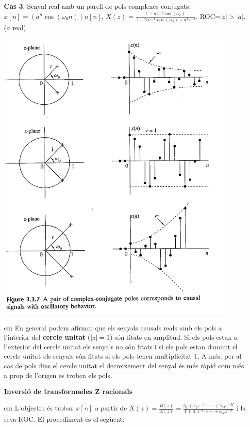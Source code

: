 \documentclass{article}
\begin{document}
\newpage
\noindent
\textbf{Cas 3}. Senyal real amb un parell de pols complexes conjugats: $x[n]=(a^n \cos(\omega_0 n) ) u[n]$, 
$X(z)=\frac{1-az^{-1}\cos(\omega_0)}{1-2az^{-1}\cos(\omega_0)+a^2z^{-2}}$, ROC=$|z|>|a|$, ($a$ real)
\begin{center}
\includegraphics[width=12cm]{doublecomplexpole.png}
\end{center}

 cm
\noindent
En general podem afirmar que els senyals causals reals amb els pols a l'interior del \textbf{cercle unitat} ($|z|=1$)
s\'on fitats en amplitud. Si els pols estan a l'exterior del cercle unitat els senyals no s\'on fitats i
si els pols estan damunt el cercle unitat els senyals s\'on fitats si els pols tenen multiplicitat 1.
A m\'es, per al cas de pols dins el cercle unitat el decreixement del senyal \'es m\'es r\`apid com m\'es
a prop de l'origen es troben els pols.

\newpage
\noindent
\textbf{Inversi\'o de transformades Z racionals}

 cm
\noindent
L'objectiu \'es trobar $x[n]$ a partir de $X(z)=\frac{B(z)}{A(z)}=
\frac{b_0+b_1z^{-1}+\cdots+b_Mz^{-M}}{1+a_1z^{-1}+\cdots+a_Nz^{-N}}$ i la seva ROC.
El procediment \'es el seg\"uent:
\end{document}
